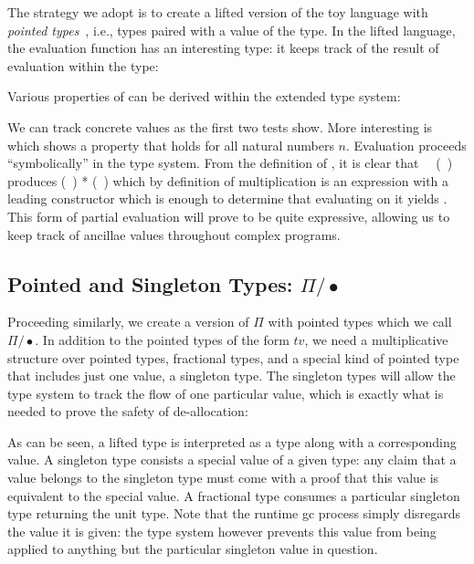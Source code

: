 \documentclass[sigplan,10pt,review,anonymous]{acmart}
\newcommand{\Afun}[1]{\AgdaFunction{#1}}
\newcommand{\Acon}[1]{\AgdaInductiveConstructor{#1}}
\newcommand{\Avar}[1]{\AgdaBound{#1}}
\begin{document}
The strategy we adopt is to create a lifted version of the toy
language with \emph{pointed types}~\cite{hottbook}, i.e., types paired with
a value of the type. In the lifted language, the evaluation
function has an interesting type: it keeps track of the result of
evaluation within the type:

\Jexamplecont{}

\vspace{-\baselineskip}

Various properties of
 can be derived within
the extended type system:

\Jexampletest{}

We can track concrete values as the first two tests
show. More interesting is  which shows a
property that holds for all natural numbers $n$. Evaluation
proceeds ``symbolically'' in the type system. From the definition
of \Afun{eval}, it is clear that
\Afun{eval}~\Acon{square}~(\Acon{suc}~\Avar{n}) produces
(\Acon{suc}~\Avar{n}) * (\Acon{suc}~\Avar{n}) which by definition of
multiplication is an expression with a leading \Acon{suc} constructor
which is enough to determine that evaluating
\Acon{isZero} on it yields \Acon{false}. This form of partial
evaluation will prove to be quite expressive, allowing us to keep track
of ancillae values throughout complex programs.

\subsection{Pointed and Singleton Types: $\Pi/\bullet$}

Proceeding similarly, we create a
version of $\Pi$ with pointed types which we call
$\Pi/\bullet$. In addition to the pointed types of the form
$t$\Acon{\#}$v$, we need a multiplicative structure over pointed
types, fractional types, and a special kind of pointed type that
includes just one value, a singleton type. The singleton types will
allow the type system to track the flow of one particular value, which
is exactly what is needed to prove the safety of de-allocation:

\PIPFUdef{}

As can be seen, a lifted type is interpreted as a type along with a
corresponding value. A singleton type consists a special value of a
given type: any claim that a value belongs to the singleton type must
come with a proof that this value is equivalent to the special
value. A fractional type consumes a particular singleton type
returning the unit type. Note that the runtime gc process simply
disregards the value it is given: the type system however prevents
this value from being applied to anything but the particular singleton
value in question.
\end{document}
